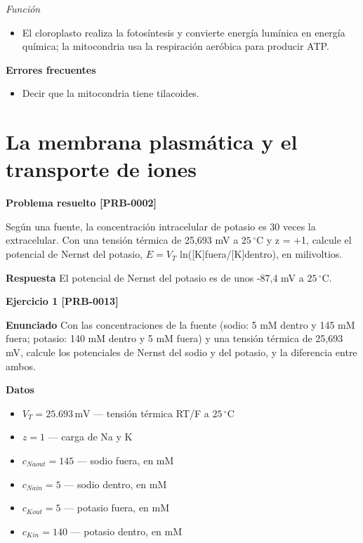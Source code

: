 \documentclass{book}
\begin{document}
\noindent\textit{Función}
\begin{itemize}
\item El cloroplasto realiza la fotosíntesis y convierte energía lumínica en energía química; la mitocondria usa la respiración aeróbica para producir ATP.
\end{itemize}

\noindent\textbf{Errores frecuentes}
\begin{itemize}
\item Decir que la mitocondria tiene tilacoides.
\end{itemize}

\section{La membrana plasmática y el transporte de iones}

\noindent\textbf{Problema resuelto [PRB-0002]}

Según una fuente, la concentración intracelular de potasio es 30 veces la extracelular. Con una tensión térmica de 25,693 mV a \(25\,{}^{\circ}\mathrm{C}\) y z = +1, calcule el potencial de Nernst del potasio, \(E = V_T\) ln([K]fuera/[K]dentro), en milivoltios.


\noindent\textbf{Respuesta}
El potencial de Nernst del potasio es de unos -87,4 mV a \(25\,{}^{\circ}\mathrm{C}\).


\noindent\textbf{Ejercicio 1 [PRB-0013]}

\noindent\textbf{Enunciado}
Con las concentraciones de la fuente (sodio: 5 mM dentro y 145 mM fuera; potasio: 140 mM dentro y 5 mM fuera) y una tensión térmica de 25,693 mV, calcule los potenciales de Nernst del sodio y del potasio, y la diferencia entre ambos.


\noindent\textbf{Datos}
\begin{itemize}
\item $V_{T} = 25.693\,\mathrm{mV}$ — tensión térmica RT/F a \(25\,{}^{\circ}\mathrm{C}\)
\item $z = 1$ — carga de Na y K
\item $c_{Na out} = 145$ — sodio fuera, en mM
\item $c_{Na in} = 5$ — sodio dentro, en mM
\item $c_{K out} = 5$ — potasio fuera, en mM
\item $c_{K in} = 140$ — potasio dentro, en mM
\end{itemize}
\end{document}
